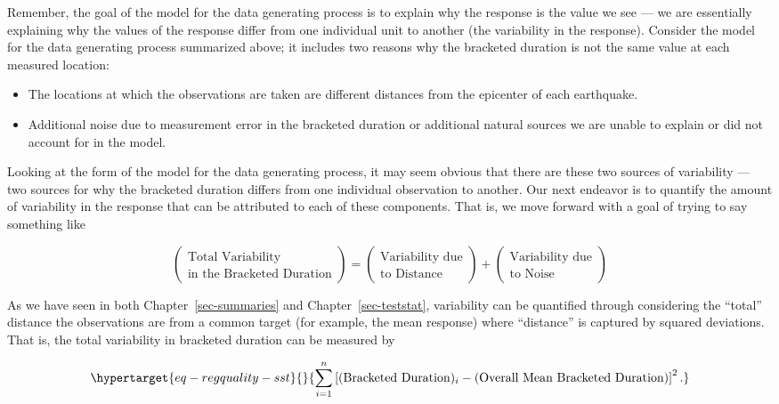 \documentclass[
  letterpaper,
  DIV=11,
  numbers=noendperiod]{scrreprt}
\providecommand{\tightlist}{%
  \setlength{\itemsep}{0pt}\setlength{\parskip}{0pt}}\usepackage{longtable,booktabs,array}
\theoremstyle{plain}
\theoremstyle{definition}
\theoremstyle{definition}
\theoremstyle{remark}
\begin{document}
Remember, the goal of the model for the data generating process is to
explain why the response is the value we see --- we are essentially
explaining why the values of the response differ from one individual
unit to another (the variability in the response). Consider the model
for the data generating process summarized above; it includes two
reasons why the bracketed duration is not the same value at each
measured location:

\begin{itemize}
\tightlist
\item
  The locations at which the observations are taken are different
  distances from the epicenter of each earthquake.
\item
  Additional noise due to measurement error in the bracketed duration or
  additional natural sources we are unable to explain or did not account
  for in the model.
\end{itemize}

Looking at the form of the model for the data generating process, it may
seem obvious that there are these two sources of variability --- two
sources for why the bracketed duration differs from one individual
observation to another. Our next endeavor is to quantify the amount of
variability in the response that can be attributed to each of these
components. That is, we move forward with a goal of trying to say
something like

\[\begin{pmatrix} \text{Total Variability} \\ \text{in the Bracketed Duration} \end{pmatrix} = \begin{pmatrix} \text{Variability due} \\ \text{to Distance} \end{pmatrix} + \begin{pmatrix} \text{Variability due} \\ \text{to Noise} \end{pmatrix}\]

As we have seen in both Chapter~\ref{sec-summaries} and
Chapter~\ref{sec-teststat}, variability can be quantified through
considering the ``total'' distance the observations are from a common
target (for example, the mean response) where ``distance'' is captured
by squared deviations. That is, the total variability in bracketed
duration can be measured by

\begin{equation}\protect\hypertarget{eq-regquality-sst}{}{\sum_{i=1}^{n} \left[(\text{Bracketed Duration})_i - (\text{Overall Mean Bracketed Duration})\right]^2.}\label{eq-regquality-sst}\end{equation}
\end{document}
